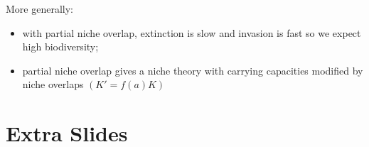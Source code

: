 \documentclass[dvipsnames]{beamer}
\begin{document}
\begin{frame}
{%
%
	\pause
	More generally:
	\begin{itemize}
		\item with partial niche overlap, extinction is slow and invasion is fast so we expect high biodiversity;%
		\pause
		\item partial niche overlap gives a niche theory with carrying capacities modified by niche overlaps $\left( K' = f(a)K \right)$ %
	\end{itemize}
}
\end{frame}



\section*{Extra Slides}
\end{document}
